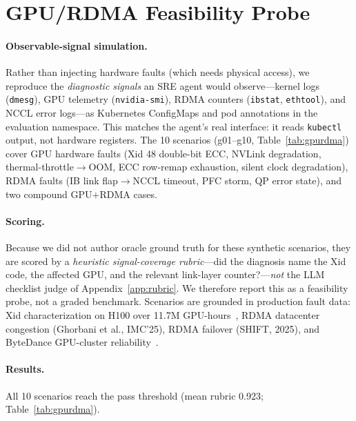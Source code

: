 \documentclass[letterpaper]{article}
\begin{document}
\section{GPU/RDMA Feasibility Probe}
\label{app:gpu}

\paragraph{Observable-signal simulation.}
Rather than injecting hardware faults (which needs physical access), we reproduce the \emph{diagnostic signals} an SRE agent would observe---kernel logs (\texttt{dmesg}), GPU telemetry (\texttt{nvidia-smi}), RDMA counters (\texttt{ibstat}, \texttt{ethtool}), and NCCL error logs---as Kubernetes ConfigMaps and pod annotations in the evaluation namespace.
This matches the agent's real interface: it reads \texttt{kubectl} output, not hardware registers.
The 10 scenarios (g01--g10, Table~\ref{tab:gpurdma}) cover GPU hardware faults (Xid 48 double-bit ECC, NVLink degradation, thermal-throttle$\rightarrow$OOM, ECC row-remap exhaustion, silent clock degradation), RDMA faults (IB link flap$\rightarrow$NCCL timeout, PFC storm, QP error state), and two compound GPU$+$RDMA cases.

\paragraph{Scoring.}
Because we did not author oracle ground truth for these synthetic scenarios, they are scored by a \emph{heuristic signal-coverage rubric}---did the diagnosis name the Xid code, the affected GPU, and the relevant link-layer counter?---\emph{not} the LLM checklist judge of Appendix~\ref{app:rubric}.
We therefore report this as a feasibility probe, not a graded benchmark.
Scenarios are grounded in production fault data: Xid characterization on H100 over 11.7M GPU-hours~\cite{cui2025gpuresilience}, RDMA datacenter congestion (Ghorbani et al., IMC'25), RDMA failover (SHIFT, 2025), and ByteDance GPU-cluster reliability~\cite{wan2025byterobust}.

\paragraph{Results.}
All 10 scenarios reach the pass threshold (mean rubric 0.923; Table~\ref{tab:gpurdma}).
\end{document}
